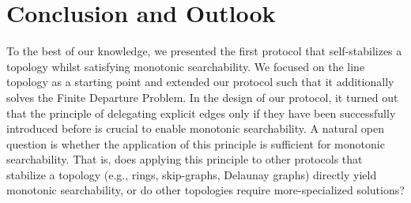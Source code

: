 \documentclass[a4paper,USenglish]{lipics}
\begin{document}
\section{Conclusion and Outlook}
To the best of our knowledge, we presented the first protocol that self-stabilizes a topology whilst satisfying monotonic searchability.
We focused on the line topology as a starting point and extended our protocol such that it additionally solves the Finite Departure Problem.
In the design of our protocol, it turned out that the principle of delegating explicit edges only if they have been successfully introduced before is crucial to enable monotonic searchability.
A natural open question is whether the application of this principle is sufficient for monotonic searchability.
That is, does applying this principle to other protocols that stabilize a topology (e.g., rings, skip-graphs, Delaunay graphs) directly yield monotonic searchability, or do other topologies require more-specialized solutions?







\end{document}
